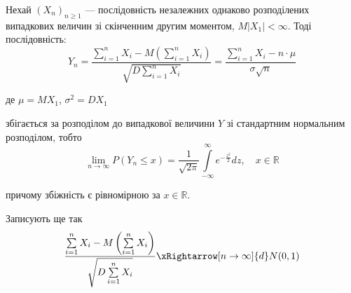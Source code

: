 \begin{theorem}
    Нехай $(X_n)_{n \geqslant 1}$ --- послідовність незалежних
    однаково розподілених випадкових величин
    зі скінченним другим моментом, $M|X_1| < \infty$.
    Тоді послідовність:
    $$Y_n = \dfrac{\sum\limits_{i=1}^n X_i - M\left( \sum\limits_{i=1}^n X_i \right)}
        {\sqrt{D \sum\limits_{i=1}^n X_i}}
    = \dfrac{\sum\limits_{i=1}^n X_i - n \cdot \mu}
        {\sigma \sqrt{n}}$$
    
    де $\mu = MX_1$, $\sigma^2 = DX_1$
    
    збігається за розподілом до випадкової величини $Y$
    зі стандартним нормальним розподілом, 
    тобто
    \begin{equation}
        \lim\limits_{n \rightarrow \infty} P(Y_n \leqslant x)
        = \dfrac{1}{\sqrt{2\pi}} \int\limits_{-\infty}^{\infty} e^{-\frac{z^2}{2}} dz, \quad x \in \mathbb{R}
    \end{equation}
    
    причому збіжність є рівномірною за $x \in \mathbb{R}$.
    
    Записують ще так
    \begin{equation}
        \dfrac{\sum\limits_{i=1}^n X_i - M\left( \sum\limits_{i=1}^n X_i \right)}
            {\sqrt{D \sum\limits_{i=1}^n X_i}}
        \xRightarrow[n \rightarrow \infty]{d} N(0, 1)
    \end{equation}
\end{theorem}
